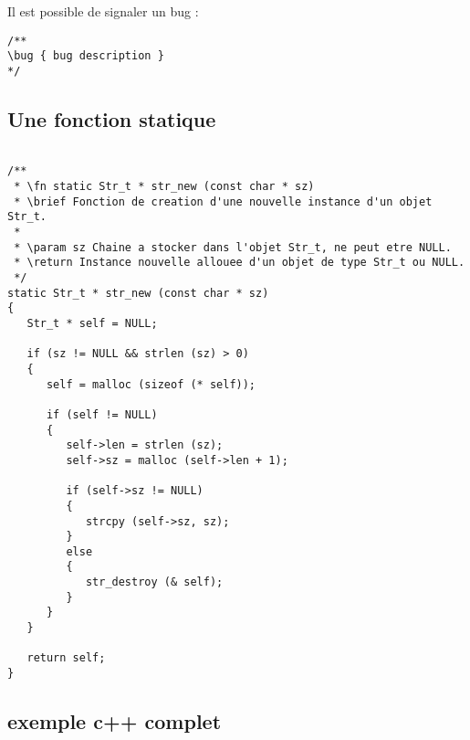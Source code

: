 Il est possible de signaler un bug : 
\begin{lstlisting}
/**
\bug { bug description }
*/ 
\end{lstlisting}
 

\subsection{Une fonction statique}

\begin{lstlisting}
 
/**
 * \fn static Str_t * str_new (const char * sz)
 * \brief Fonction de creation d'une nouvelle instance d'un objet Str_t.
 *
 * \param sz Chaine a stocker dans l'objet Str_t, ne peut etre NULL.
 * \return Instance nouvelle allouee d'un objet de type Str_t ou NULL.
 */
static Str_t * str_new (const char * sz)
{
   Str_t * self = NULL;
 
   if (sz != NULL && strlen (sz) > 0)
   {
      self = malloc (sizeof (* self));
 
      if (self != NULL)
      {
         self->len = strlen (sz);
         self->sz = malloc (self->len + 1);
 
         if (self->sz != NULL)
         {
            strcpy (self->sz, sz);
         }
         else
         {
            str_destroy (& self);
         }
      }
   }
 
   return self;
}
\end{lstlisting}


\subsection{exemple c++ complet}

